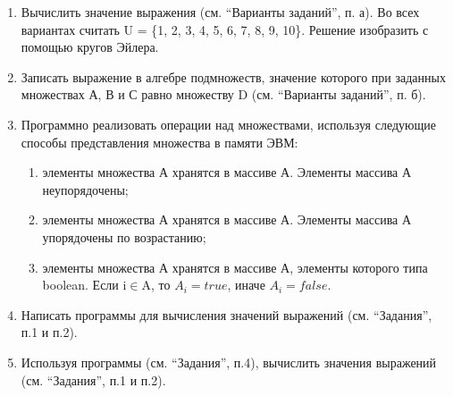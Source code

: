 \documentclass[a4paper,14pt]{extarticle}
\begin{document}
    \begin{enumerate}
    	\item Вычислить значение выражения (см. “Варианты заданий”, п. а). Во всех вариантах считать U = \{1, 2, 3, 4, 5, 6, 7, 8, 9, 10\}. Решение изобразить с помощью кругов Эйлера.
    	\item Записать выражение в алгебре подмножеств, значение которого при заданных множествах А, В и С равно множеству D (см. “Варианты заданий”, п. б).
    	\item Программно реализовать операции над множествами, используя следующие способы представления множества в памяти ЭВМ:
    	\begin{enumerate}[label=\asbuk*),ref=\asbuk*] %
    		\item элементы множества А хранятся в массиве А. Элементы массива А неупорядочены;
    		\item элементы множества А хранятся в массиве А. Элементы массива А упорядочены по возрастанию;
    		\item элементы множества А хранятся в массиве А, элементы которого типа boolean. Если i$\in$A, то $A_i=true$, иначе $A_i=false$.
    	\end{enumerate}
    \item Написать программы для вычисления значений выражений (см. “Задания”, п.1 и п.2).
    \item Используя программы (см. “Задания”, п.4), вычислить значения выражений (см. “Задания”, п.1 и п.2).
    \end{enumerate}
	\newpage
\end{document}
